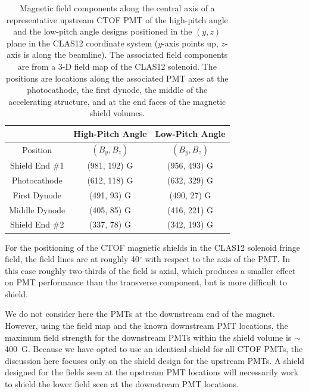\documentclass{elsart}
\begin{document}
\begin{table}[htbp]
\begin{center}
\begin{tabular} {|c|c|c|} \hline
               & High-Pitch Angle & Low-Pitch Angle \\ \hline
Position       & $(B_y,B_z)$      & $(B_y,B_z)$  \\ \hline
Shield End \#1 & (981, 192) G     & (956, 493) G \\ \hline
Photocathode   & (612, 118) G     & (632, 329) G \\ \hline
First Dynode   & (491,  93) G     & (490,  27) G \\ \hline
Middle Dynode  & (405,  85) G     & (416, 221) G \\ \hline
Shield End \#2 & (337,  78) G     & (342, 193) G \\ \hline \hline
\end{tabular}
\end{center}
\caption{Magnetic field components along the central axis of a representative upstream CTOF 
PMT of the high-pitch angle and the low-pitch angle designs positioned in the $(y,z)$ plane 
in the CLAS12 coordinate system ($y$-axis points up, $z$-axis is along the beamline). The
associated field components are from a 3-D field map of the CLAS12 solenoid. The positions are
locations along the associated PMT axes at the photocathode, the first dynode, the middle of the
accelerating structure, and at the end faces of the magnetic shield volumes.}
\label{field-position}
\end{table}

For the positioning of the CTOF magnetic shields in the CLAS12 solenoid fringe field, the field 
lines are at roughly 40$^\circ$ with respect to the axis of the PMT. In this case roughly two-thirds
of the field is axial, which produces a smaller effect on PMT performance than the transverse
component, but is more difficult to shield.

We do not consider here the PMTs at the downstream end of the magnet. However, using the field 
map and the known downstream PMT locations, the maximum field strength for the downstream PMTs 
within the shield volume is $\sim$400~G. Because we have opted to use an identical shield for all
CTOF PMTs, the discussion here focuses only on the shield design for the upstream PMTs. A shield
designed for the fields seen at the upstream PMT locations will necessarily work to shield the lower
field seen at the downstream PMT locations.
\end{document}
